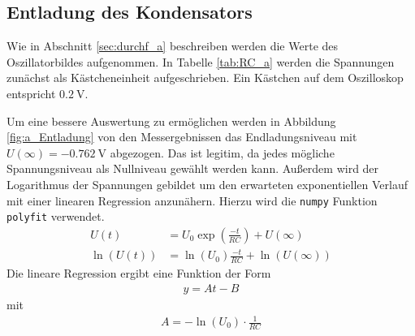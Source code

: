 \subsection{Entladung des Kondensators}
Wie in Abschnitt \ref{sec:durchf_a} beschreiben werden die Werte des Oszillatorbildes aufgenommen. 
In Tabelle \ref{tab:RC_a} werden die Spannungen zunächst als Kästcheneinheit aufgeschrieben.
Ein Kästchen auf dem Oszilloskop entspricht $\qty{0.2}{\volt}$.
%

%
Um eine bessere Auswertung zu ermöglichen werden in Abbildung \ref{fig:a_Entladung} von den Messergebnissen 
das Endladungsniveau mit $U(\infty) = \qty[]{-0.762}{\volt}$ abgezogen.
Das ist legitim, da jedes mögliche Spannungsniveau als Nullniveau gewählt werden kann.
Außerdem wird der Logarithmus der Spannungen gebildet um den erwarteten exponentiellen Verlauf mit einer linearen Regression anzunähern.
Hierzu wird die \texttt{numpy} Funktion \texttt{polyfit} verwendet.
\begin{align*}
    U(t)&= U_0 \exp \left(\frac{-t}{RC}\right) + U(\infty) \\
    \ln(U(t)) &= \ln(U_0) \frac{-t}{RC} + \ln(U(\infty))
\end{align*}
Die lineare Regression ergibt eine Funktion der Form
\begin{align*}
    y  = A t - B
\end{align*}
mit
\begin{align*}
    A = - \ln(U_0) \cdot \frac{1}{RC}
\end{align*}



